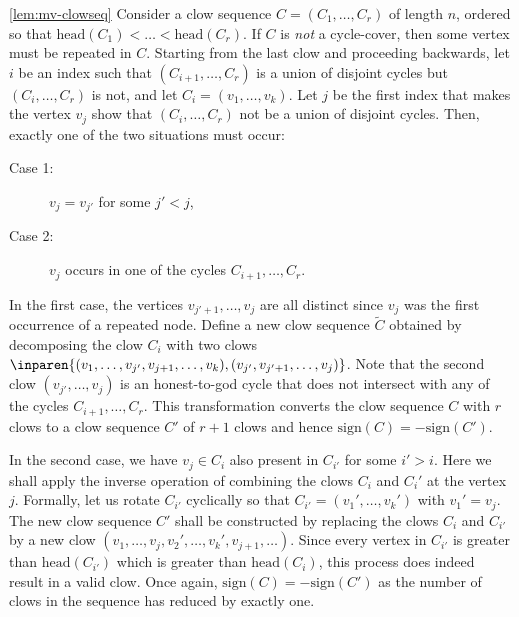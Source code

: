 \begin{proofof}{\autoref{lem:mv-clowseq}}
Consider a clow sequence $C = (C_1,\dots, C_r)$ of length $n$, ordered so that $\mathrm{head}(C_1) < \dots < \mathrm{head}(C_r)$.
If $C$ is \emph{not} a cycle-cover, then some vertex must be repeated in $C$.
Starting from the last clow and proceeding backwards, let $i$ be an index such that $(C_{i+1},\dots, C_{r})$ is a union of disjoint cycles but $(C_{i},\dots, C_r)$ is not, and let $C_i = (v_1,\dots, v_k)$.
Let $j$ be the first index that makes the vertex $v_{j}$ show that $(C_i,\dots, C_r)$ not be a union of disjoint cycles.
Then, exactly one of the two situations must occur:
\begin{description}
 \item[Case 1:] $v_{j} = v_{j'}$ for some $j' < j$,

 \item[Case 2:] $v_{j}$ occurs in one of the cycles $C_{i+1},\dots, C_r$.
\end{description}

In the first case, the vertices $v_{j'+1},\dots, v_{j}$ are all distinct since $v_j$ was the first occurrence of a repeated node.
Define a new clow sequence  $\tilde{C}$ obtained by decomposing the clow $C_i$ with two clows $\inparen{(v_1,\dots, v_{j'},v_{j+1},\dots, v_k), (v_{j'},v_{j'+1},\dots,v_{j})}$.
Note that the second clow $(v_{j'},\dots, v_j)$ is an honest-to-god cycle that does not intersect with any of the cycles $C_{i+1},\dots, C_r$.
This transformation converts the clow sequence $C$ with $r$ clows to a clow sequence $C'$ of $r+1$ clows and hence $\mathrm{sign}(C) = - \mathrm{sign}(C')$.

In the second case, we have $v_j \in C_i$ also present in $C_{i'}$ for some $i' > i$.
Here we shall apply the inverse operation of combining the clows $C_i$ and $C_i'$ at the vertex $j$.
Formally, let us rotate $C_{i'}$ cyclically so that $C_{i'} = (v_1',\dots, v_k')$ with $v_1' = v_j$.
The new clow sequence $C'$ shall be constructed by replacing the clows $C_i$ and $C_{i'}$ by a new clow $(v_1,\dots, v_j, v_2',\dots, v_k', v_{j+1},\dots)$.
Since every vertex in $C_{i'}$ is greater than $\mathrm{head}(C_{i'})$ which is greater than $\mathrm{head}(C_i)$, this process does indeed result in a valid clow.
Once again, $\mathrm{sign}(C) = - \mathrm{sign}(C')$ as the number of clows in the sequence has reduced by exactly one.\\

\end{proofof}
